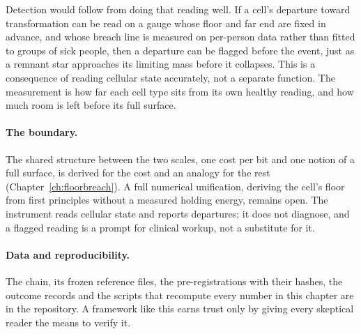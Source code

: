 Detection would follow from doing that reading well. If a cell's departure toward transformation can be read on a gauge whose floor and
far end are fixed in advance, and whose breach line is measured on per-person data rather than fitted to groups of sick people, then a
departure can be flagged before the event, just as a remnant star approaches its limiting mass before it collapses. \prediction{} This is
a consequence of reading cellular state accurately, not a separate function. The measurement is how far each cell type sits from its own
healthy reading, and how much room is left before its full surface. \interp

\paragraph{The boundary.} The shared structure between the two scales, one cost per bit and one notion of a full surface, is derived for
the cost and an analogy for the rest (Chapter~\ref{ch:floorbreach}). A full numerical unification, deriving the cell's floor from first
principles without a measured holding energy, remains open. \openprob{} The instrument reads cellular state and reports departures; it
does not diagnose, and a flagged reading is a prompt for clinical workup, not a substitute for it.

\paragraph{Data and reproducibility.} The chain, its frozen reference files, the pre-registrations with their hashes, the outcome records
and the scripts that recompute every number in this chapter
are in the repository. A framework like this earns trust only by giving every skeptical reader the means to verify it.
